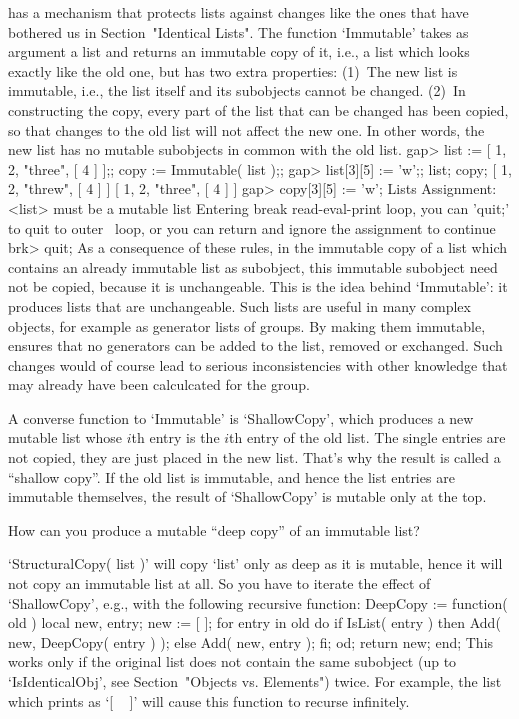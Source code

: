{\GAP} has a mechanism that protects lists against  changes like the ones
that have bothered   us in    Section~"Identical Lists". The     function
`Immutable' takes as argument a list and returns an immutable copy of it,
i.e., a list  which  looks exactly like the   old one, but has  two extra
properties:
(1)~The new list is immutable, i.e.,  the list itself and its subobjects 
    cannot be changed.
(2)~In constructing the copy, every part of  the list that can be changed
    has been copied, so that changes to the  old list will not affect the
    new one.  In other words, the new  list has no  mutable subobjects in
    common with the old list.
\begintt
    gap> list := [ 1, 2, "three", [ 4 ] ];; copy := Immutable( list );;
    gap> list[3][5] := 'w';; list; copy;
    [ 1, 2, "threw", [ 4 ] ]
    [ 1, 2, "three", [ 4 ] ]
    gap> copy[3][5] := 'w';
    Lists Assignment: <list> must be a mutable list
    Entering break read-eval-print loop, you can 'quit;' to quit to outer \
    loop,
    or you can return and ignore the assignment to continue
    brk> quit;
\endtt
As a consequence of  these rules, in the  immutable copy of a list  which
contains an already immutable list as subobject, this immutable subobject
need not be copied,  because it is unchangeable. This is the idea  behind
`Immutable': it produces lists that are unchangeable. Such lists are
useful in many complex {\GAP} objects,  for example as generator lists of
groups. By  making them immutable, {\GAP}  ensures that no generators can
be added to the list, removed or exchanged. Such  changes would of course
lead  to serious inconsistencies with  other  knowledge that may already
have been calculcated for the group.

A converse function to `Immutable' is `ShallowCopy', which produces a new
mutable list  whose $i$th entry  is the $i$th entry of  the old list. The
single  entries  are not copied,  they are  just placed in  the new list.
That's why the  result is called a ``shallow  copy''. If the  old list is
immutable, and hence  the  list  entries  are immutable themselves,   the
result of `ShallowCopy' is mutable only at the top.

%
\exercise How can  you produce  a  mutable ``deep copy'' of  an immutable
list?

\answer `StructuralCopy( list )' will copy `list' only as deep  as  it is
mutable, hence it will not copy an immutable list at all.  So you have to
iterate the effect  of `ShallowCopy', e.g.,  with the following recursive
function:
\begintt
    DeepCopy := function( old )
    local   new,  entry;
        new := [  ];  for entry  in old  do
        if IsList( entry )  then  Add( new, DeepCopy( entry ) );
                            else  Add( new, entry );  fi;  od;
        return new;
    end;
\endtt
This works only if the original list  does not contain the same subobject
(up to `IsIdenticalObj', see Section~"Objects vs. Elements") twice.
For example, the list which {\GAP} prints as `[ ~ ]' will cause this
function to recurse infinitely.

